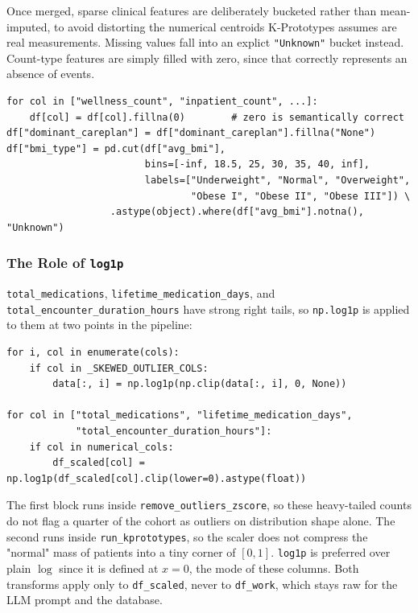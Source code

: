 Once merged, sparse clinical features are deliberately bucketed rather than mean-imputed, to avoid distorting the numerical centroids K-Prototypes assumes are real measurements. Missing values fall into an explict \texttt{"Unknown"} bucket instead. Count-type features are simply filled with zero, since that correctly represents an absence of events.

\begin{lstlisting}[style=pythonstyle]
for col in ["wellness_count", "inpatient_count", ...]:
    df[col] = df[col].fillna(0)        # zero is semantically correct
df["dominant_careplan"] = df["dominant_careplan"].fillna("None")
df["bmi_type"] = pd.cut(df["avg_bmi"],
                        bins=[-inf, 18.5, 25, 30, 35, 40, inf],
                        labels=["Underweight", "Normal", "Overweight",
                                "Obese I", "Obese II", "Obese III"]) \
                  .astype(object).where(df["avg_bmi"].notna(), "Unknown")
\end{lstlisting}

\subsubsection*{The Role of \texttt{log1p}}

\texttt{total\_medications}, \texttt{lifetime\_medication\_days}, and \texttt{total\_encounter\_duration\_hours} have strong right tails, so \texttt{np.log1p} is applied to them at two points in the pipeline:

\begin{lstlisting}[style=pythonstyle]
for i, col in enumerate(cols):
    if col in _SKEWED_OUTLIER_COLS:
        data[:, i] = np.log1p(np.clip(data[:, i], 0, None))

for col in ["total_medications", "lifetime_medication_days",
            "total_encounter_duration_hours"]:
    if col in numerical_cols:
        df_scaled[col] = np.log1p(df_scaled[col].clip(lower=0).astype(float))
\end{lstlisting}

\noindent The first block runs inside \texttt{remove\_outliers\_zscore}, so these heavy-tailed counts do not flag a quarter of the cohort as outliers on distribution shape alone. The second runs inside \texttt{run\_kprototypes}, so the scaler does not compress the "normal" mass of patients into a tiny corner of $[0,1]$. \texttt{log1p} is preferred over plain $\log$ since it is defined at $x=0$, the mode of these columns. Both transforms apply only to \texttt{df\_scaled}, never to \texttt{df\_work}, which stays raw for the LLM prompt and the database.

